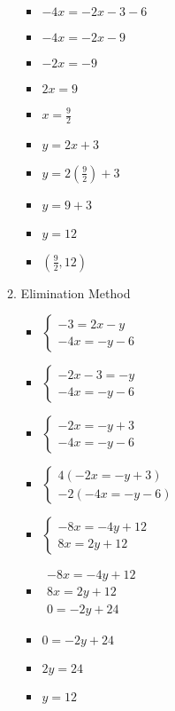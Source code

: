 \documentclass{article}
\begin{document}
\begin{enumerate}
\begin{enumerate}
\begin{itemize}
    \item $-4x=-2x-3-6$
    \item $-4x=-2x-9$
    \item $-2x=-9$
    \item $2x=9$
    \item {\Large $x=\frac{9}{2}$}
    \item $y=2x+3$
    \item {\Large $y=2\left(\frac{9}{2}\right)+3$}
    \item $y=9+3$
    \item $y=12$
    \item {\Large $\left(\frac{9}{2},12\right)$}
    \end{itemize}
  \item Elimination Method
    \begin{itemize}
    \item $\left\{ \begin{array}{l}
          -3=2x-y \\
          -4x=-y-6 \end{array} \right.$
    \item $\left\{ \begin{array}{l}
          -2x-3=-y \\
          -4x=-y-6 \end{array} \right.$
    \item $\left\{ \begin{array}{l}
          -2x=-y+3 \\
          -4x=-y-6 \end{array} \right.$
    \item $\left\{ \begin{array}{l}
          4(-2x=-y+3) \\
          -2(-4x=-y-6) \end{array} \right.$
    \item $\left\{ \begin{array}{l}
          -8x=-4y+12 \\
          8x=2y+12 \end{array} \right.$
    \item $\begin{array}{l}
          -8x=-4y+12 \\
          8x=2y+12 \\ \hline
          0=-2y+24 \end{array}$
    \item $0=-2y+24$
    \item $2y=24$
    \item $y=12$

\end{itemize}
\end{enumerate}
\end{enumerate}
\end{document}
